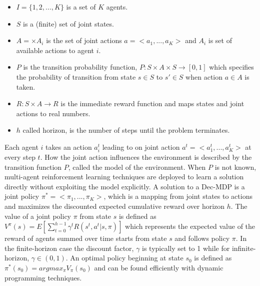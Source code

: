 \documentclass[journal,onecolumn]{IEEEtran}
\begin{document}
\begin{itemize}
\item $I=\{ 1,2,...,K \}$ is a set of $K$ agents.
\item $S$ is a (finite) set of joint states.
\item  $A= \times A_i$ is the set of joint actions $a=<a_1,...,a_K>$ and $A_i$ is set of available actions to agent $i$.
\item $P$ is the transition probability function, $P: S\times A \times S \rightarrow [0,1]$ which specifies the probability of transition from state $s \in S$ to $s' \in S$ when action $a \in A$ is taken.
\item $R: S \times A \rightarrow R$ is the immediate reward function and maps states and joint actions to real numbers.
\item $h$ called horizon, is the number of steps until the problem terminates.
\end{itemize}
Each agent $i$ takes an action $a_i^t$ leading to on joint action $a^t=<a_1^t,...,a_K^t>$ at every step $t$. How the joint action influences the environment is described by the transition function $P$, called the model of the environment. When $P$ is not known, multi-agent reinforcement learning techniques are deployed to learn a solution directly without exploiting the model explicitly.
A solution to a Dec-MDP is a joint policy $\pi^*=<\pi_1,...,\pi_K>$, which is a mapping from joint states to actions and maximizes the discounted expected cumulative reward over horizon $h$. The value of a joint policy $\pi$ from state $s$ is defined as $V^{\pi}(s) = E[\sum_{t=0}^{h-1} \gamma^t R(s^t,a^t|s,\pi)]$ which represents the expected value of the reward of agents summed over time starts from state $s$ and follows policy $\pi$. In the finite-horizon case the discount factor, $\gamma$ is typically set to 1 while for infinite-horizon, $\gamma \in (0,1)$. An optimal policy beginning at state $s_0$ is defined as $\pi^*(s_0) = argmax_{\pi} V_{\pi}(s_0)$ and can be found efficiently with dynamic programming techniques.
\end{document}

